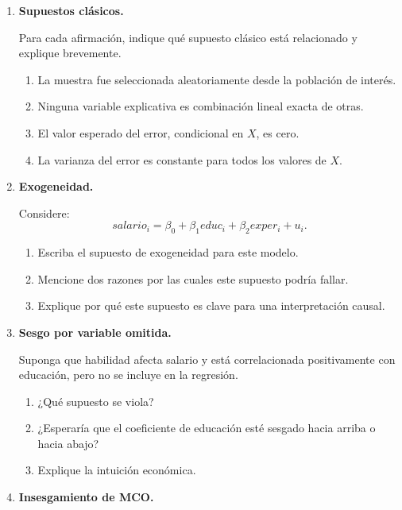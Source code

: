 \documentclass[11pt]{article}
\begin{document}
\begin{enumerate}[label=\textbf{Ejercicio \arabic*.}, leftmargin=*]

\item \textbf{Supuestos clásicos.}

Para cada afirmación, indique qué supuesto clásico está relacionado y explique brevemente.

\begin{enumerate}[label=\alph*)]
    \item La muestra fue seleccionada aleatoriamente desde la población de interés.
    \item Ninguna variable explicativa es combinación lineal exacta de otras.
    \item El valor esperado del error, condicional en \(X\), es cero.
    \item La varianza del error es constante para todos los valores de \(X\).
\end{enumerate}

\item \textbf{Exogeneidad.}

Considere:
\[
salario_i=\beta_0+\beta_1educ_i+\beta_2exper_i+u_i.
\]

\begin{enumerate}[label=\alph*)]
    \item Escriba el supuesto de exogeneidad para este modelo.
    \item Mencione dos razones por las cuales este supuesto podría fallar.
    \item Explique por qué este supuesto es clave para una interpretación causal.
\end{enumerate}

\item \textbf{Sesgo por variable omitida.}

Suponga que habilidad afecta salario y está correlacionada positivamente con educación, pero no se incluye en la regresión.

\begin{enumerate}[label=\alph*)]
    \item ¿Qué supuesto se viola?
    \item ¿Esperaría que el coeficiente de educación esté sesgado hacia arriba o hacia abajo?
    \item Explique la intuición económica.
\end{enumerate}

\item \textbf{Insesgamiento de MCO.}


\end{enumerate}
\end{document}
